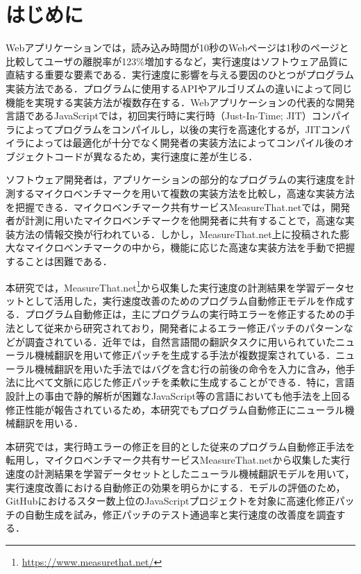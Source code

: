 \documentclass[submit,ses,noauthor]{ipsj}
\begin{document}
\section{はじめに}

Webアプリケーションでは，読み込み時間が10秒のWebページは1秒のページと比較してユーザの離脱率が123\%増加する\cite{an_2018}など，実行速度はソフトウェア品質に直結する重要な要素である．実行速度に影響を与える要因のひとつがプログラム実装方法である．プログラムに使用するAPIやアルゴリズムの違いによって同じ機能を実現する実装方法が複数存在する．Webアプリケーションの代表的な開発言語であるJavaScriptでは，初回実行時に実行時（Just-In-Time; JIT）コンパイラによってプログラムをコンパイルし，以後の実行を高速化するが，JITコンパイラによっては最適化が十分でなく開発者の実装方法によってコンパイル後のオブジェクトコードが異なるため，実行速度に差が生じる．

ソフトウェア開発者は，アプリケーションの部分的なプログラムの実行速度を計測するマイクロベンチマークを用いて複数の実装方法を比較し，高速な実装方法を把握できる．マイクロベンチマーク共有サービスMeasureThat.netでは，開発者が計測に用いたマイクロベンチマークを他開発者に共有することで，高速な実装方法の情報交換が行われている．しかし，MeasureThat.net上に投稿された膨大なマイクロベンチマークの中から，機能に応じた高速な実装方法を手動で把握することは困難である．

本研究では，MeasureThat.net\footnote{\url{https://www.measurethat.net/}}から収集した実行速度の計測結果を学習データセットとして活用した，実行速度改善のためのプログラム自動修正モデルを作成する．プログラム自動修正は，主にプログラムの実行時エラーを修正するための手法として従来から研究されており，開発者によるエラー修正パッチのパターンなどが調査されている．近年では，自然言語間の翻訳タスクに用いられていたニューラル機械翻訳を用いて修正パッチを生成する手法が複数提案されている\cite{lutellier_2020}．ニューラル機械翻訳を用いた手法ではバグを含む行の前後の命令を入力に含み，他手法に比べて文脈に応じた修正パッチを柔軟に生成することができる．特に，言語設計上の事由で静的解析が困難なJavaScript等の言語においても他手法を上回る修正性能が報告されているため\cite{lutellier_2020}，本研究でもプログラム自動修正にニューラル機械翻訳を用いる．

本研究では，実行時エラーの修正を目的とした従来のプログラム自動修正手法を転用し，マイクロベンチマーク共有サービスMeasureThat.netから収集した実行速度の計測結果を学習データセットとしたニューラル機械翻訳モデルを用いて，実行速度改善における自動修正の効果を明らかにする．モデルの評価のため，GitHubにおけるスター数上位のJavaScriptプロジェクトを対象に高速化修正パッチの自動生成を試み，修正パッチのテスト通過率と実行速度の改善度を調査する．
\end{document}
